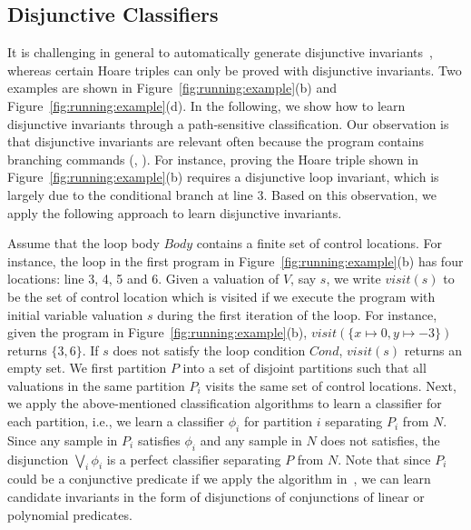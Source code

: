 \subsection{Disjunctive Classifiers} \label{disjunctive}
It is challenging in general to automatically generate disjunctive invariants~\cite{DBLP:conf/cav/SharmaDDA11,DBLP:conf/pldi/GulwaniSV08}, whereas certain Hoare triples can only be proved with disjunctive invariants. Two examples are shown in Figure~\ref{fig:running:example}(b) and Figure~\ref{fig:running:example}(d). In the following, we show how to learn disjunctive invariants through a path-sensitive classification. Our observation is that disjunctive invariants are relevant often because the program contains branching commands (, ). %
 For instance, proving the Hoare triple shown in Figure~\ref{fig:running:example}(b) requires a disjunctive loop invariant, which is largely due to the conditional branch at line 3. Based on this observation, we apply the following approach to learn disjunctive invariants.

Assume that the loop body $Body$ contains a finite set of control locations. For instance, the loop in the first program in Figure~\ref{fig:running:example}(b) has four locations: line 3, 4, 5 and 6. Given a valuation of $V$, say $s$, we write $visit(s)$ to be the set of control location which is visited if we execute the program with initial variable valuation $s$ during the first iteration of the loop. For instance, given the program in Figure~\ref{fig:running:example}(b), $visit(\{x \mapsto 0, y \mapsto -3\})$ returns $\{3,6\}$. If $s$ does not satisfy the loop condition $Cond$, $visit(s)$ returns an empty set. We first partition $P$ into a set of disjoint partitions such that all valuations in the same partition $P_i$ visits the same set of control locations. Next, we apply the above-mentioned classification algorithms to learn a classifier for each partition, i.e., we learn a classifier $\phi_i$ for partition $i$ separating $P_i$ from $N$.
Since any sample in $P_i$ satisfies $\phi_i$ and any sample in $N$ does not satisfies, the disjunction $\bigvee_i \phi_i$ is a perfect classifier separating $P$ from $N$. Note that since $P_i$ could be a conjunctive predicate if we apply the algorithm in~\cite{sharma2012interpolants}, we can learn candidate invariants in the form of disjunctions of conjunctions of linear or polynomial predicates.

